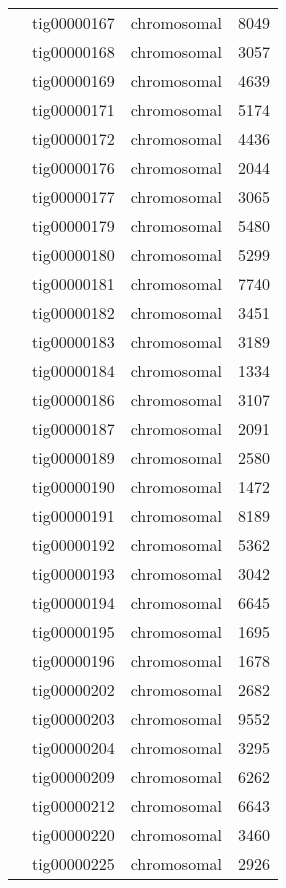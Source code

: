 {\begin{supertabular}{llcr}
         & tig00000167 & chromosomal & 8049 \\
         & tig00000168 & chromosomal & 3057 \\
         & tig00000169 & chromosomal & 4639 \\
         & tig00000171 & chromosomal & 5174 \\
         & tig00000172 & chromosomal & 4436 \\
         & tig00000176 & chromosomal & 2044 \\
         & tig00000177 & chromosomal & 3065 \\
         & tig00000179 & chromosomal & 5480 \\
         & tig00000180 & chromosomal & 5299 \\
         & tig00000181 & chromosomal & 7740 \\
         & tig00000182 & chromosomal & 3451 \\
         & tig00000183 & chromosomal & 3189 \\
         & tig00000184 & chromosomal & 1334 \\
         & tig00000186 & chromosomal & 3107 \\
         & tig00000187 & chromosomal & 2091 \\
         & tig00000189 & chromosomal & 2580 \\
         & tig00000190 & chromosomal & 1472 \\
         & tig00000191 & chromosomal & 8189 \\
         & tig00000192 & chromosomal & 5362 \\
         & tig00000193 & chromosomal & 3042 \\
         & tig00000194 & chromosomal & 6645 \\
         & tig00000195 & chromosomal & 1695 \\
         & tig00000196 & chromosomal & 1678 \\
         & tig00000202 & chromosomal & 2682 \\
         & tig00000203 & chromosomal & 9552 \\
         & tig00000204 & chromosomal & 3295 \\
         & tig00000209 & chromosomal & 6262 \\
         & tig00000212 & chromosomal & 6643 \\
         & tig00000220 & chromosomal & 3460 \\
         & tig00000225 & chromosomal & 2926 \\

\end{supertabular}}
